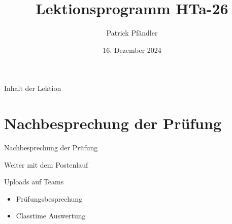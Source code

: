 





\title{\textbf{Lektionsprogramm HTa-26}}
\author{Patrick Pfändler}
\date{16. Dezember 2024}




\frame{\titlepage}

\begin{frame}{Inhalt der Lektion}
	\tableofcontents
\end{frame}


\section{Nachbesprechung der Prüfung}
\begin{frame}{Nachbesprechung der Prüfung}
\end{frame}



\begin{frame}{Weiter mit dem Postenlauf}
\end{frame}







\begin{frame}{Uploads auf Teams}
	\begin{itemize}
		\item[\textbullet] Prüfungsbesprechung 
		\item[\textbullet] Classtime Auswertung
	\end{itemize}
	
\end{frame}

\folieFragen
{}

